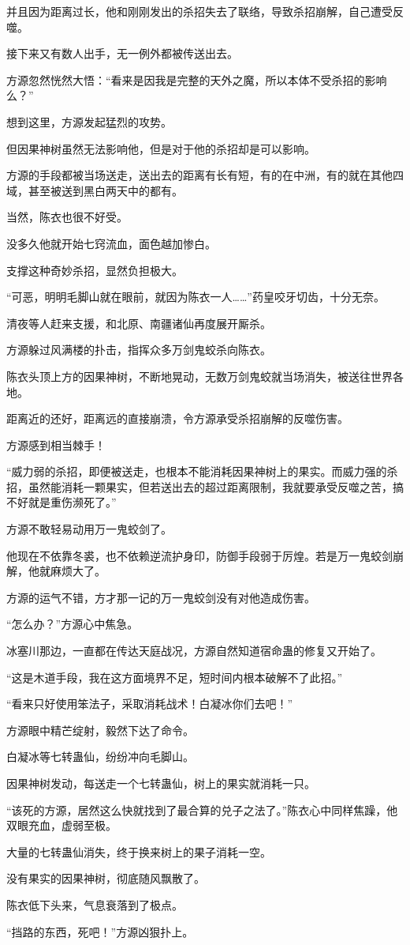 \begin{this_body}
并且因为距离过长，他和刚刚发出的杀招失去了联络，导致杀招崩解，自己遭受反噬。

接下来又有数人出手，无一例外都被传送出去。

方源忽然恍然大悟：“看来是因我是完整的天外之魔，所以本体不受杀招的影响么？”

想到这里，方源发起猛烈的攻势。

但因果神树虽然无法影响他，但是对于他的杀招却是可以影响。

方源的手段都被当场送走，送出去的距离有长有短，有的在中洲，有的就在其他四域，甚至被送到黑白两天中的都有。

当然，陈衣也很不好受。

没多久他就开始七窍流血，面色越加惨白。

支撑这种奇妙杀招，显然负担极大。

“可恶，明明毛脚山就在眼前，就因为陈衣一人……”药皇咬牙切齿，十分无奈。

清夜等人赶来支援，和北原、南疆诸仙再度展开厮杀。

方源躲过风满楼的扑击，指挥众多万剑鬼蛟杀向陈衣。

陈衣头顶上方的因果神树，不断地晃动，无数万剑鬼蛟就当场消失，被送往世界各地。

距离近的还好，距离远的直接崩溃，令方源承受杀招崩解的反噬伤害。

方源感到相当棘手！

“威力弱的杀招，即便被送走，也根本不能消耗因果神树上的果实。而威力强的杀招，虽然能消耗一颗果实，但若送出去的超过距离限制，我就要承受反噬之苦，搞不好就是重伤濒死了。”

方源不敢轻易动用万一鬼蛟剑了。

他现在不依靠冬裘，也不依赖逆流护身印，防御手段弱于厉煌。若是万一鬼蛟剑崩解，他就麻烦大了。

方源的运气不错，方才那一记的万一鬼蛟剑没有对他造成伤害。

“怎么办？”方源心中焦急。

冰塞川那边，一直都在传达天庭战况，方源自然知道宿命蛊的修复又开始了。

“这是木道手段，我在这方面境界不足，短时间内根本破解不了此招。”

“看来只好使用笨法子，采取消耗战术！白凝冰你们去吧！”

方源眼中精芒绽射，毅然下达了命令。

白凝冰等七转蛊仙，纷纷冲向毛脚山。

因果神树发动，每送走一个七转蛊仙，树上的果实就消耗一只。

“该死的方源，居然这么快就找到了最合算的兑子之法了。”陈衣心中同样焦躁，他双眼充血，虚弱至极。

大量的七转蛊仙消失，终于换来树上的果子消耗一空。

没有果实的因果神树，彻底随风飘散了。

陈衣低下头来，气息衰落到了极点。

“挡路的东西，死吧！”方源凶狠扑上。

\end{this_body}

